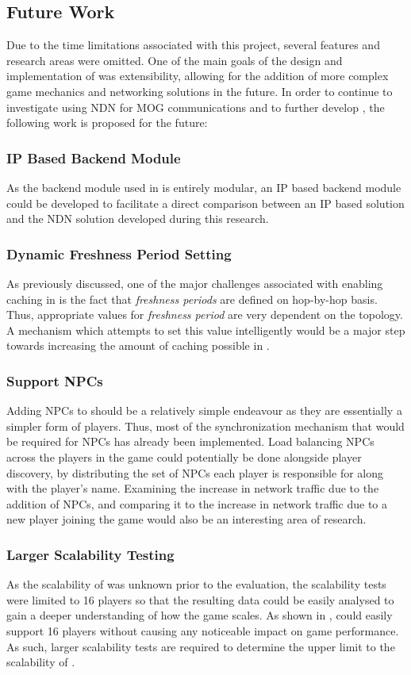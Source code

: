 \subsection{Future Work}\label{sec:conc:fw}
Due to the time limitations associated with this project, several features and research areas were omitted. One of the main goals of the design and implementation of \game{} was extensibility, allowing for the addition of more complex game mechanics and networking solutions in the future. In order to continue to investigate using NDN for MOG communications and to further develop \game{}, the following work is proposed for the future:

\subsubsection{IP Based Backend Module}
As the backend module used in \game{} is entirely modular, an IP based backend module could be developed to facilitate a direct comparison between an IP based solution and the NDN solution developed during this research.

\subsubsection{Dynamic Freshness Period Setting}
As previously discussed, one of the major challenges associated with enabling caching in \game{} is the fact that \textit{freshness periods} are defined on hop-by-hop basis. Thus, appropriate values for \textit{freshness period} are very dependent on the topology. A mechanism which attempts to set this value intelligently would be a major step towards increasing the amount of caching possible in \game{}.

\subsubsection{Support NPCs}
Adding NPCs to \game{} should be a relatively simple endeavour as they are essentially a simpler form of players. Thus, most of the synchronization mechanism that would be required for NPCs has already been implemented. Load balancing NPCs across the players in the game could potentially be done alongside player discovery, by distributing the set of NPCs each player is responsible for along with the player's name. Examining the increase in network traffic due to the addition of NPCs, and comparing it to the increase in network traffic due to a new player joining the game would also be an interesting area of research.

\subsubsection{Larger Scalability Testing}
As the scalability of \game{} was unknown prior to the evaluation, the scalability tests were limited to 16 players so that the resulting data could be easily analysed to gain a deeper understanding of how the game scales. As shown in , \game{} could easily support 16 players without causing any noticeable impact on game performance. As such, larger scalability tests are required to determine the upper limit to the scalability of \game{}. 